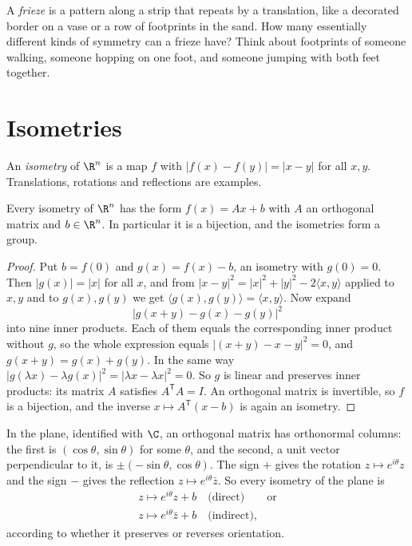 \begin{think}
A \emph{frieze} is a pattern along a strip that repeats by a translation, like a decorated border on a vase or a row of footprints in
the sand. How many essentially different kinds of symmetry can a frieze have? Think about footprints of someone walking, someone
hopping on one foot, and someone jumping with both feet together.
\end{think}

\section{Isometries}

An \emph{isometry} of $\R^n$ is a map $f$ with $|f(x)-f(y)|=|x-y|$ for all $x,y$. Translations, rotations and reflections are examples.

\begin{theorem}\label{geometry:thm:isometryaffine}
Every isometry of $\R^n$ has the form $f(x)=Ax+b$ with $A$ an orthogonal matrix and $b\in\R^n$. In particular it is a bijection, and
the isometries form a group.
\end{theorem}
\begin{proof}
Put $b=f(0)$ and $g(x)=f(x)-b$, an isometry with $g(0)=0$. Then $|g(x)|=|x|$ for all $x$, and from
$|x-y|^2=|x|^2+|y|^2-2\langle x,y\rangle$ applied to $x,y$ and to $g(x),g(y)$ we get $\langle g(x),g(y)\rangle=\langle x,y\rangle$. Now
expand
\[
|g(x+y)-g(x)-g(y)|^2
\]
into nine inner products. Each of them equals the corresponding inner product without $g$, so the whole expression equals
$|(x+y)-x-y|^2=0$, and $g(x+y)=g(x)+g(y)$. In the same way $|g(\lambda x)-\lambda g(x)|^2=|\lambda x-\lambda x|^2=0$. So $g$ is linear and
preserves inner products: its matrix $A$ satisfies $A^{\mathsf T}A=I$. An orthogonal matrix is invertible, so $f$ is a bijection, and
the inverse $x\mapsto A^{\mathsf T}(x-b)$ is again an isometry.
\end{proof}

In the plane, identified with $\C$, an orthogonal matrix has orthonormal columns: the first is $(\cos\theta,\sin\theta)$ for some $\theta$, and
the second, a unit vector perpendicular to it, is $\pm(-\sin\theta,\cos\theta)$. The sign $+$ gives the rotation $z\mapsto e^{i\theta}z$ and the sign $-$
gives the reflection $z\mapsto e^{i\theta}\bar z$. So every isometry of the plane is
\begin{equation}\label{geometry:eq:isomC}
\begin{gathered}
z\mapsto e^{i\theta}z+b\quad\text{(direct)}\qquad\text{or}\\
z\mapsto e^{i\theta}\bar z+b\quad\text{(indirect)},
\end{gathered}
\end{equation}
according to whether it preserves or reverses orientation.

